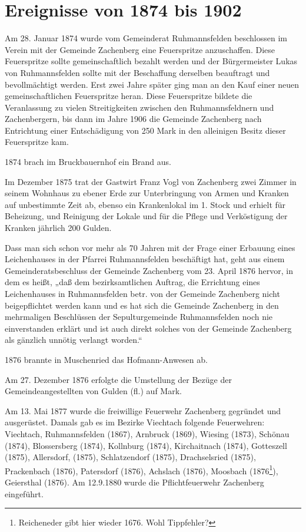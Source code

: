 \documentclass[12pt,a4pager,draft]{book}
\begin{document}
\section{Ereignisse von 1874 bis 1902}

Am 28. Januar 1874 wurde vom Gemeinderat Ruhmannsfelden beschlossen im Verein
mit der Gemeinde Zachenberg eine Feuerspritze anzuschaffen. Diese Feuerspritze
sollte gemeinschaftlich bezahlt werden und der Bürgermeister Lukas von
Ruhmannsfelden sollte mit der Beschaffung derselben beauftragt und
bevollmächtigt werden. Erst zwei Jahre später ging man an den Kauf einer neuen
gemeinschaftlichen Feuerspritze heran. Diese Feuerspritze bildete die
Veranlassung zu vielen Streitigkeiten zwischen den Ruhmannsfeldnern und
Zachenbergern, bis dann im Jahre 1906 die Gemeinde Zachenberg nach Entrichtung
einer Entschädigung von 250 Mark in den alleinigen Besitz dieser Feuerspritze
kam.

1874 brach im Bruckbauernhof ein Brand aus.

Im Dezember 1875 trat der Gastwirt Franz Vogl von Zachenberg zwei Zimmer in
seinem Wohnhaus zu ebener Erde zur Unterbringung von Armen und Kranken auf
unbestimmte Zeit ab, ebenso ein Krankenlokal im 1. Stock und erhielt für
Beheizung, und Reinigung der Lokale und für die Pflege und Verköstigung der
Kranken jährlich 200 Gulden.

Dass man sich schon vor mehr als 70 Jahren mit der Frage einer Erbauung eines
Leichenhauses in der Pfarrei Ruhmannsfelden beschäftigt hat, geht aus einem
Gemeinderatsbeschluss der Gemeinde Zachenberg vom 23. April 1876 hervor, in dem
es heißt, „daß dem bezirksamtlichen Auftrag, die Errichtung eines Leichenhauses
in Ruhmannsfelden betr. von der Gemeinde Zachenberg nicht beigepflichtet werden
kann und es hat sich die Gemeinde Zachenberg in den mehrmaligen Beschlüssen der
Sepulturgemeinde Ruhmannsfelden noch nie einverstanden erklärt und ist auch
direkt solches von der Gemeinde Zachenberg als gänzlich unnötig verlangt
worden.“

1876 brannte in Muschenried das Hofmann-Anwesen ab.

Am 27. Dezember 1876 erfolgte die Umstellung der Bezüge der Gemeindeangestellten
von Gulden (fl.) auf Mark.

Am 13. Mai 1877 wurde die freiwillige Feuerwehr Zachenberg gegründet und
ausgerüstet. Damals gab es im Bezirke Viechtach folgende Feuerwehren: Viechtach,
Ruhmannsfelden (1867), Arnbruck (1869), Wiesing (1873), Schönau (1874),
Blossersberg (1874), Kollnburg (1874), Kirchaitnach (1874), Gotteszell (1875),
Allersdorf, (1875), Schlatzendorf (1875), Drachselsried (1875), Prackenbach
(1876), Patersdorf (1876), Achslach (1876), Moosbach (1876\footnote{Reicheneder
gibt hier wieder 1676. Wohl Tippfehler?}), Geiersthal (1876). Am 12.9.1880 wurde
die Pflichtfeuerwehr Zachenberg eingeführt.
\end{document}
